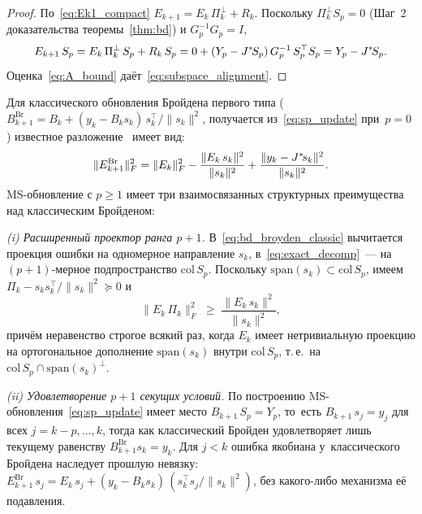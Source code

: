 \begin{proof}
По~\eqref{eq:Ek1_compact} $E_{k+1} = E_k\,\Pi_k^\perp + R_k$. Поскольку
$\Pi_k^\perp S_p = 0$ (Шаг~2 доказательства теоремы~\ref{thm:bd}) и
$G_p^{-1} G_p = I$,
\[
  E_{k+1}\,S_p
  = E_k\,\Pi_k^\perp\,S_p + R_k\,S_p
  = 0 + (Y_p - J^{*}\!S_p)\,G_p^{-1}\,S_p^\top S_p
  = Y_p - J^{*}\!S_p.
\]
Оценка~\eqref{eq:A_bound} даёт~\eqref{eq:subspace_alignment}.
\end{proof}


\begin{remark}\label{rem:comparison}
Для классического обновления Бройдена первого типа
($B_{k+1}^{\mathrm{Br}} = B_k + (y_k - B_k s_k)\,s_k^\top/\|s_k\|^2$,
получается из~\eqref{eq:sp_update} при~$p=0$) известное
разложение~\cite[Th.~8.2.2]{dennis1996} имеет вид:
\begin{equation}\label{eq:bd_broyden_classic}
  \|E_{k+1}^{\mathrm{Br}}\|_F^2
  = \|E_k\|_F^2 - \frac{\|E_k\,s_k\|^2}{\|s_k\|^2}
    + \frac{\|y_k - J^{*}\!s_k\|^2}{\|s_k\|^2}.
\end{equation}
MS-обновление с $p\ge 1$ имеет три взаимосвязанных структурных
преимущества над классическим Бройденом:

\smallskip
\noindent\textit{(i) Расширенный проектор ранга $p{+}1$.}
В~\eqref{eq:bd_broyden_classic} вычитается проекция ошибки на
одномерное направление $s_k$, в~\eqref{eq:exact_decomp}~--- на
$(p{+}1)$-мерное подпространство $\mathrm{col}\,S_p$. Поскольку
$\mathrm{span}(s_k)\subset\mathrm{col}\,S_p$, имеем
$\Pi_k - s_k s_k^\top/\|s_k\|^2 \succeq 0$ и
\begin{equation}\label{eq:neg-term-dominance}
  \|E_k\,\Pi_k\|_F^2 \;\ge\; \frac{\|E_k\,s_k\|^2}{\|s_k\|^2},
\end{equation}
причём неравенство строгое всякий раз, когда $E_k$ имеет нетривиальную
проекцию на ортогональное дополнение $\mathrm{span}(s_k)$ внутри
$\mathrm{col}\,S_p$, т.\,е.\ на
$\mathrm{col}\,S_p\cap\mathrm{span}(s_k)^\perp$.

\smallskip
\noindent\textit{(ii) Удовлетворение $p{+}1$ секущих условий.}
По построению MS-обновления~\eqref{eq:sp_update} имеет место
$B_{k+1}\,S_p = Y_p$, то~есть $B_{k+1}\,s_j = y_j$ для всех
$j = k{-}p,\ldots,k$, тогда как классический Бройден удовлетворяет лишь
текущему равенству $B_{k+1}^{\mathrm{Br}} s_k = y_k$. Для $j < k$ ошибка
якобиана у~классического Бройдена наследует прошлую невязку:
$E_{k+1}^{\mathrm{Br}}\,s_j = E_k\,s_j +
(y_k - B_k s_k)\,(s_k^\top s_j/\|s_k\|^2)$,
без какого-либо механизма её подавления.


\end{remark}
